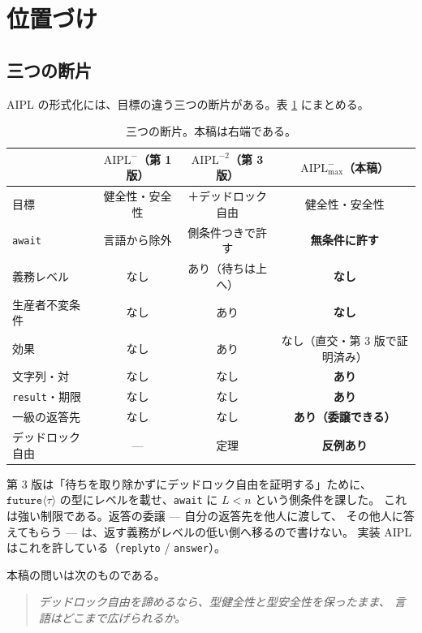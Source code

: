 \documentclass[11pt,a4paper]{ltjsarticle}
\theoremstyle{definition}
\theoremstyle{remark}
\newcommand{\tfut}[1]{\ensuremath{\mathtt{future}\langle #1 \rangle}}
\newcommand{\Amax}{\ensuremath{\mathrm{AIPL}^{-}_{\max}}}
\newcommand{\Atwo}{\ensuremath{\mathrm{AIPL}^{-2}}}
\newcommand{\Aone}{\ensuremath{\mathrm{AIPL}^{-}}}
\begin{document}
\section{位置づけ}

\subsection{三つの断片}

AIPL の形式化には、目標の違う三つの断片がある。表 \ref{tab:three} にまとめる。

\begin{table}[htbp]
\centering
\caption{三つの断片。本稿は右端である。}
\label{tab:three}
\small
\begin{tabular}{lccc}
\toprule
 & \Aone（第 1 版） & \Atwo（第 3 版） & \Amax（本稿） \\
\midrule
目標          & 健全性・安全性 & ＋デッドロック自由 & 健全性・安全性 \\
\texttt{await} & 言語から除外 & 側条件つきで許す & \textbf{無条件に許す} \\
義務レベル     & なし & あり（待ちは上へ） & \textbf{なし} \\
生産者不変条件 & なし & あり & \textbf{なし} \\
効果           & なし & あり & なし（直交・第 3 版で証明済み）\\
文字列・対     & なし & なし & \textbf{あり} \\
\texttt{result}・期限 & なし & なし & \textbf{あり} \\
一級の返答先   & なし & なし & \textbf{あり（委譲できる）} \\
デッドロック自由 & --- & 定理 & \textbf{反例あり} \\
\bottomrule
\end{tabular}
\end{table}

第 3 版は「待ちを取り除かずにデッドロック自由を証明する」ために、
\tfut{\tau} の型にレベルを載せ、\texttt{await} に $L < n$ という側条件を課した。
これは強い制限である。返答の委譲 --- 自分の返答先を他人に渡して、
その他人に答えてもらう --- は、返す義務がレベルの低い側へ移るので書けない。
実装 AIPL はこれを許している（\texttt{replyto} / \texttt{answer}）。

本稿の問いは次のものである。
\begin{quote}
\emph{デッドロック自由を諦めるなら、型健全性と型安全性を保ったまま、
言語はどこまで広げられるか。}
\end{quote}
\end{document}
